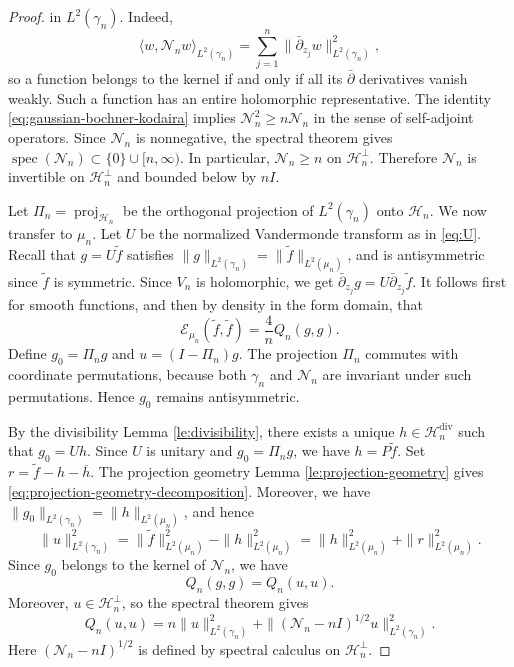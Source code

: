 \documentclass[11pt,reqno]{amsart}
\numberwithin{equation}{section}%
\numberwithin{figure}{section}%
\numberwithin{table}{section}
\theoremstyle{plain}
\theoremstyle{definition}
\begin{document}
\begin{proof}
  in $L^2(\gamma_n)$. Indeed,
  \[
    \langle w,\mathcal{N}_nw\rangle_{L^2(\gamma_n)}
    =
    \sum_{j=1}^n
    \|\bar\partial_{z_j}w\|_{L^2(\gamma_n)}^2,
  \]
  so a function belongs to the kernel if and only if all its $\bar\partial$
  derivatives vanish weakly. Such a function has an entire holomorphic
  representative. The identity \eqref{eq:gaussian-bochner-kodaira} implies
  $\mathcal{N}_n^2\geq n\mathcal{N}_n$ in the sense of self-adjoint operators.
  Since $\mathcal{N}_n$ is nonnegative, the spectral theorem gives
  $\operatorname{spec}(\mathcal{N}_n) \subset \{0\}\cup[n,\infty)$. In
  particular, $\mathcal{N}_n\geq n$ on $\mathcal{H}_n^\perp$. Therefore
  $\mathcal{N}_n$ is invertible on $\mathcal{H}_n^\perp$ and bounded below by
  $nI$.

  Let $\Pi_n=\operatorname{proj}_{\mathcal{H}_n}$ be the orthogonal projection
  of $L^2(\gamma_n)$ onto $\mathcal{H}_n$. We now transfer to $\mu_n$. Let $U$
  be the normalized Vandermonde transform as in \eqref{eq:U}. Recall that
  $g=U\widetilde f$ satisfies
  $\|g\|_{L^2(\gamma_n)}=\|\widetilde f\|_{L^2(\mu_n)}$, and is antisymmetric
  since $\widetilde f$ is symmetric. Since $V_n$ is holomorphic, we
  get $\bar\partial_{z_j}g=U\bar\partial_{z_j}\widetilde f$. It follows first
  for smooth functions, and then by density in the form domain, that
  \begin{equation}\label{eq:gamma-two-energy-number-operator}
    \mathcal{E}_{\mu_n}(\widetilde f,\widetilde f) = \frac{4}{n}Q_n(g,g).
  \end{equation}
  Define $g_0=\Pi_ng$ and $u=(I-\Pi_n)g$. The projection $\Pi_n$ commutes with
  coordinate permutations, because both $\gamma_n$ and $\mathcal{N}_n$ are
  invariant under such permutations. Hence $g_0$ remains antisymmetric.

  By the divisibility Lemma \ref{le:divisibility}, there exists a unique
  $h\in\mathcal{H}_n^{\mathrm{div}}$ such that $g_0=Uh$. Since $U$ is unitary
  and $g_0=\Pi_ng$, we have $h=P\widetilde f$. Set
  $r=\widetilde f-h-\overline h$. The projection geometry Lemma
  \ref{le:projection-geometry} gives
  \eqref{eq:projection-geometry-decomposition}. Moreover,
  we have $\|g_0\|_{L^2(\gamma_n)}=\|h\|_{L^2(\mu_n)}$, and hence
  \begin{equation}\label{eq:gamma-two-u-norm}
    \|u\|_{L^2(\gamma_n)}^2
    = \|\widetilde f\|_{L^2(\mu_n)}^2 - \|h\|_{L^2(\mu_n)}^2
    = \|h\|_{L^2(\mu_n)}^2 + \|r\|_{L^2(\mu_n)}^2.
  \end{equation}
  Since $g_0$ belongs to the kernel of $\mathcal{N}_n$, we have
  \begin{equation}
    Q_n(g,g)=Q_n(u,u).
  \end{equation}
  Moreover, $u\in\mathcal{H}_n^\perp$, so the spectral theorem gives
  \begin{equation}\label{eq:gamma-two-number-square}
    Q_n(u,u) = n\|u\|_{L^2(\gamma_n)}^2 +
    \|(\mathcal{N}_n-nI)^{1/2}u\|_{L^2(\gamma_n)}^2.
  \end{equation}
  Here $(\mathcal{N}_n-nI)^{1/2}$ is defined by spectral calculus on
  $\mathcal{H}_n^\perp$.


\end{proof}
\end{document}
